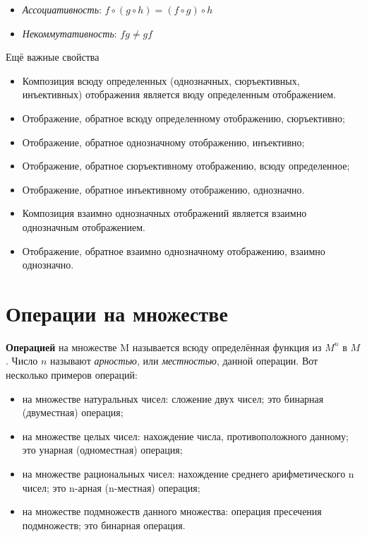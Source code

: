 \documentclass[a4paper]{article}
\begin{document}
{\begin{small}
\begin{itemize}
\item \textit{Ассоциативность}: $f \circ (g \circ h) = (f \circ g) \circ h$
\item \textit{Некоммутативность}: $fg \neq gf$

\end{itemize}

Ещё важные свойства \begin{itemize}
\item Композиция всюду определенных (однозначных, сюръективных, инъективных) отображения является вюду определенным отображением.
\item Отображение, обратное всюду определенному отображению, сюръективно;
\item Отображение, обратное однозначному отображению, инъективно;
\item Отображение, обратное сюръективному отображению, всюду определенное;
\item Отображение, обратное инъективному отображению, однозначно.
\item Композиция взаимно однозначных отображений является взаимно однозначным отображением.
\item Отображение, обратное взаимно однозначному отображению, взаимно однозначно.
\end{itemize}

\section*{Операции на множестве}
\textbf{Операцией} на множестве M называется всюду
определённая функция из $M^n$ в $M$. Число $n$ называют \textit{арностью}, или
\textit{местностью}, данной операции.
Вот несколько примеров операций:
\begin{itemize}
\item на множестве натуральных чисел: сложение двух чисел; это бинарная
(двуместная) операция;
\item на множестве целых чисел: нахождение числа, противоположного
данному; это унарная (одноместная) операция;
\item на множестве рациональных чисел: нахождение среднего арифметического
n чисел; это n-арная (n-местная) операция;
\item на множестве подмножеств данного множества: операция пресечения
подмножеств; это бинарная операция.
\end{itemize}


\end{small}}
\end{document}
